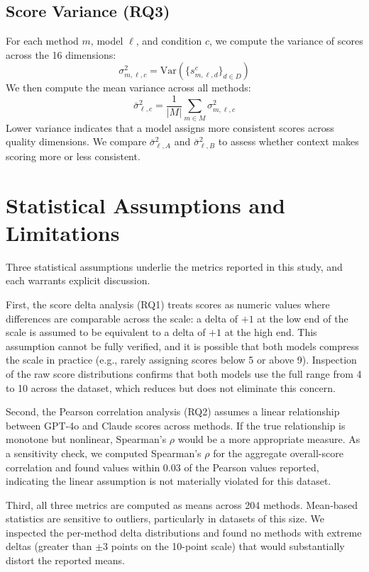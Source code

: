 \documentclass[12pt]{report}
\begin{document}
\subsection{Score Variance (RQ3)}

For each method $m$, model $\ell$, and condition $c$, we compute the variance of scores across the 16 dimensions:
\[
\sigma^2_{m,\ell,c} = \text{Var}\left(\{s^c_{m,\ell,d}\}_{d \in D}\right)
\]
We then compute the mean variance across all methods:
\[
\bar{\sigma}^2_{\ell,c} = \frac{1}{|M|} \sum_{m \in M} \sigma^2_{m,\ell,c}
\]
Lower variance indicates that a model assigns more consistent scores across quality dimensions. We compare $\bar{\sigma}^2_{\ell,A}$ and $\bar{\sigma}^2_{\ell,B}$ to assess whether context makes scoring more or less consistent.

\section{Statistical Assumptions and Limitations}

Three statistical assumptions underlie the metrics reported in this study, and each warrants explicit discussion.

First, the score delta analysis (RQ1) treats scores as numeric values where differences are comparable across the scale: a delta of $+1$ at the low end of the scale is assumed to be equivalent to a delta of $+1$ at the high end. This assumption cannot be fully verified, and it is possible that both models compress the scale in practice (e.g., rarely assigning scores below 5 or above 9). Inspection of the raw score distributions confirms that both models use the full range from 4 to 10 across the dataset, which reduces but does not eliminate this concern.

Second, the Pearson correlation analysis (RQ2) assumes a linear relationship between GPT-4o and Claude scores across methods. If the true relationship is monotone but nonlinear, Spearman's $\rho$ would be a more appropriate measure. As a sensitivity check, we computed Spearman's $\rho$ for the aggregate overall-score correlation and found values within 0.03 of the Pearson values reported, indicating the linear assumption is not materially violated for this dataset.

Third, all three metrics are computed as means across 204 methods. Mean-based statistics are sensitive to outliers, particularly in datasets of this size. We inspected the per-method delta distributions and found no methods with extreme deltas (greater than $\pm$3 points on the 10-point scale) that would substantially distort the reported means.
\end{document}
